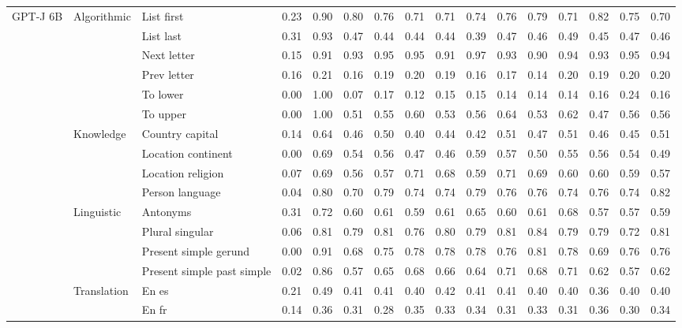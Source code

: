 \begin{center}
\begin{longtable}{lllrrrrrrrrrrrrr}
\multirow[t]{18}{*}{GPT-J 6B} & \multirow[t]{6}{*}{Algorithmic} & List first & 0.23 & 0.90 & 0.80 & 0.76 & 0.71 & 0.71 & 0.74 & 0.76 & 0.79 & 0.71 & 0.82 & 0.75 & 0.70 \\
 &  & List last & 0.31 & 0.93 & 0.47 & 0.44 & 0.44 & 0.44 & 0.39 & 0.47 & 0.46 & 0.49 & 0.45 & 0.47 & 0.46 \\
 &  & Next letter & 0.15 & 0.91 & 0.93 & 0.95 & 0.95 & 0.91 & 0.97 & 0.93 & 0.90 & 0.94 & 0.93 & 0.95 & 0.94 \\
 &  & Prev letter & 0.16 & 0.21 & 0.16 & 0.19 & 0.20 & 0.19 & 0.16 & 0.17 & 0.14 & 0.20 & 0.19 & 0.20 & 0.20 \\
 &  & To lower & 0.00 & 1.00 & 0.07 & 0.17 & 0.12 & 0.15 & 0.15 & 0.14 & 0.14 & 0.14 & 0.16 & 0.24 & 0.16 \\
 &  & To upper & 0.00 & 1.00 & 0.51 & 0.55 & 0.60 & 0.53 & 0.56 & 0.64 & 0.53 & 0.62 & 0.47 & 0.56 & 0.56 \\
\cline{2-16}
 & \multirow[t]{4}{*}{Knowledge} & Country capital & 0.14 & 0.64 & 0.46 & 0.50 & 0.40 & 0.44 & 0.42 & 0.51 & 0.47 & 0.51 & 0.46 & 0.45 & 0.51 \\
 &  & Location continent & 0.00 & 0.69 & 0.54 & 0.56 & 0.47 & 0.46 & 0.59 & 0.57 & 0.50 & 0.55 & 0.56 & 0.54 & 0.49 \\
 &  & Location religion & 0.07 & 0.69 & 0.56 & 0.57 & 0.71 & 0.68 & 0.59 & 0.71 & 0.69 & 0.60 & 0.60 & 0.59 & 0.57 \\
 &  & Person language & 0.04 & 0.80 & 0.70 & 0.79 & 0.74 & 0.74 & 0.79 & 0.76 & 0.76 & 0.74 & 0.76 & 0.74 & 0.82 \\
\cline{2-16}
 & \multirow[t]{4}{*}{Linguistic} & Antonyms & 0.31 & 0.72 & 0.60 & 0.61 & 0.59 & 0.61 & 0.65 & 0.60 & 0.61 & 0.68 & 0.57 & 0.57 & 0.59 \\
 &  & Plural singular & 0.06 & 0.81 & 0.79 & 0.81 & 0.76 & 0.80 & 0.79 & 0.81 & 0.84 & 0.79 & 0.79 & 0.72 & 0.81 \\
 &  & Present simple gerund & 0.00 & 0.91 & 0.68 & 0.75 & 0.78 & 0.78 & 0.78 & 0.76 & 0.81 & 0.78 & 0.69 & 0.76 & 0.76 \\
 &  & Present simple past simple & 0.02 & 0.86 & 0.57 & 0.65 & 0.68 & 0.66 & 0.64 & 0.71 & 0.68 & 0.71 & 0.62 & 0.57 & 0.62 \\
\cline{2-16}
 & \multirow[t]{4}{*}{Translation} & En es & 0.21 & 0.49 & 0.41 & 0.41 & 0.40 & 0.42 & 0.41 & 0.41 & 0.40 & 0.40 & 0.36 & 0.40 & 0.40 \\
 &  & En fr & 0.14 & 0.36 & 0.31 & 0.28 & 0.35 & 0.33 & 0.34 & 0.31 & 0.33 & 0.31 & 0.36 & 0.30 & 0.34 \\

\end{longtable}
\end{center}
